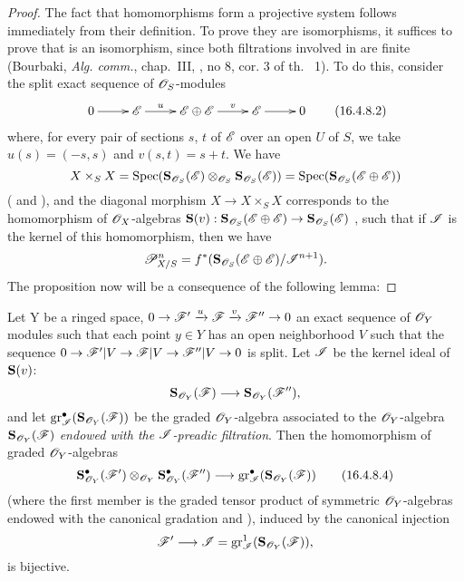 \begin{proof}
The fact that homomorphisms  form a projective system follows immediately from their definition.
To prove they are isomorphisms, it suffices to 
prove that  is an isomorphism, since both filtrations involved in  are finite (Bourbaki, \emph{Alg. comm.}, chap.~III, , no 8, cor. 3 of th. ~1).
To do this, consider the split exact sequence of $\mathscr{O}_S$-modules
\[
  \label{IV.16.4.8.2}
  \xymatrix{
    0 \ar[r] & \sh{E} \ar[r]^-u & \sh{E} \oplus \sh{E} \ar[r]^-v & \sh{E} \ar[r] & 0
  }
  \tag{16.4.8.2}
\] 
where, for every pair of sections $s$, $t$ of $\mathscr{E}$ over an open $U$ of $S$, we take $u(s) = (-s, s)$ and $v(s,t) = s + t$.
We have
\[
  X \times_S X = \operatorname{Spec}(\mathbf{S}_{\mathscr{O}_S}(\mathscr{E}) \otimes_{\mathscr{O}_S} \mathbf{S}_{\mathscr{O}_S}(\mathscr{E})) = \operatorname{Spec}(\mathbf{S}_{\mathscr{O}_S}(\mathscr{E} \oplus \mathscr{E}))
\]
( and ), and the diagonal morphism $X \to X \times_S X$ corresponds  to the homomorphism of $\mathscr{O}_X$-algebras $\bb{S}(v): \bb{S}_{\sh{O}_S}(\sh{E} \oplus \sh{E}) \to \bb{S}_{\sh{O}_S}(\sh{E})$ , such that if $\mathscr{I}$ is the kernel of this homomorphism, then we have
\[
  \mathscr{P}_{X/S}^n = f^*(\mathbf{S}_{\mathscr{O}_S}(\mathscr{E} \oplus \mathscr{E})/\mathscr{I}^{n+1}).
\]
The proposition now will be a consequence of the following lemma:
\end{proof}

\begin{lemma}[16.4.8.3]
\label{IV.16.4.8.3}
Let Y be a ringed space, $0 \to \sh{F}'  \xrightarrow{u} \sh{F} \xrightarrow{v} \sh{F}'' \to 0$ an exact sequence of $\mathscr{O}_Y$ modules such that each point $y \in Y$ has an open neighborhood $V$ such that the sequence $0 \to \sh{F}'|V \to \sh{F}|V \to \sh{F}''|V \to 0$ is split.
Let $\mathscr{I}$ be the kernel ideal of $\mathbf{S}(v)$:
\[
  \bb{S}_{\sh{O}_Y}(\sh{F}) \to \bb{S}_{\sh{O}_Y}(\sh{F}''),
\]
and let $\operatorname{gr}_{\mathscr{I}}^\bullet(\mathbf{S}_{\mathscr{O}_Y}(\mathscr{F}))$ be the graded $\mathscr{O}_Y$-algebra associated to the $\mathscr{O}_Y$-algebra $\mathbf{S}_{\mathscr{O}_Y}(\mathscr{F})$ \emph{endowed with the $\mathscr{I}$-preadic filtration}.
Then the homomorphism of graded $\mathscr{O}_Y$-algebras
\[
  \label{IV.16.4.8.4}
  \bb{S}_{\sh{O}_Y}^\bullet(\sh{F}') \otimes_{\sh{O}_Y} \bb{S}_{\sh{O}_Y}^\bullet(\sh{F}'') \to \gr_{\sh{I}}^\bullet(\bb{S}_{\sh{O}_Y}(\sh{F}))
  \tag{16.4.8.4}
\]
(where the first member is the graded tensor product of symmetric $\mathscr{O}_Y$-algebras endowed with the canonical gradation  and ), induced by the canonical injection
\[
  \sh{F}' \to \sh{I} = \gr_{\sh{I}}^1(\bb{S}_{\sh{O}_Y}(\sh{F})),
\]
is bijective.
\end{lemma}

